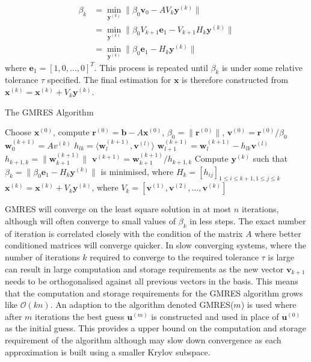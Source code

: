  \begin{equation*}
 \begin{aligned}
          \beta_k &= \min\limits_{\bm{y}^{(k)}} \lVert  \beta_0 \bm{v}_0 - AV_k\bm{y}^{(k)} \rVert \\
          &= \min\limits_{\bm{y}^{(k)}} \lVert \beta_0 V_{k+1} \bm{e}_1 - V_{k+1}H_k\bm{y}^{(k)} \rVert \\
          &= \min\limits_{\bm{y}^{(k)}} \lVert \beta_0 \bm{e}_1 - H_k\bm{y}^{(k)} \rVert
 \end{aligned}
 \end{equation*}
where $\bm{e}_1 = [1,0,\dots,0]^T$. This process is repeated until $\beta_k$ is under some relative tolerance $\tau$ specified. The final estimation for $\bm{x}$ is therefore constructed from $\bm{x}^{(k)} = \bm{x}^{(k)} + V_k\bm{y}^{(k)}$.
\begin{algorithm}
\caption{The GMRES Algorithm}\label{alg:GMRES}
\begin{algorithmic}[1]
\State Choose $\bm{x}^{(0)}$, compute $\bm{r}^{(0)}=\bm{b}-A\bm{x}^{(0)}$, $\beta_0 = \lVert \bm{r}^{(0)} \rVert$, $\bm{v}^{(0)} = \bm{r}^{(0)}/\beta_0$
\State $\bm{w}_0^{(k+1)} = Av^{(k)}$
\State $h_{lk}=\langle \bm{w}_l^{(k+1)}, \bm{v}^{(l)} \rangle$
\State $\bm{w}_{l+1}^{(k+1)} = \bm{w}_l^{(k+1)} - h_{lk}\bm{v}^{(l)}$
\EndFor
\State $h_{k+1,k}=\lVert \bm{w}_{k+1}^{(k+1)} \rVert$
\State $\bm{v}^{(k+1)} = \bm{w}_{k+1}^{(k+1)}/h_{k+1,k}$
\State Compute $\bm{y}^{(k)}$ such that $\beta_k = \lVert \beta_0 \bm{e}_1 - H_k  \bm{y}^{(k)} \rVert$ is minimised, where
\State $H_k = [h_{ij}]_{1 \leq i \leq k+1, 1 \leq j \leq k}$
\EndFor
\State $\bm{x}^{(k)} = \bm{x}^{(k)} + V_k\bm{y}^{(k)}$, where $V_k = [\bm{v}^{(1)},\bm{v}^{(2)},\dots,\bm{v}^{(k)}]$
\end{algorithmic}
\end{algorithm}

GMRES will converge on the least square solution in at most $n$ iterations, although will often converge to small values of $\beta_k$ in less steps. The exact number of iteration is correlated closely with the  condition of the matrix $A$ where better conditioned matrices will converge quicker. In slow converging systems, where the number of iterations $k$ required to converge to the required tolerance $\tau$ is large can result in large computation and storage requirements as the new vector $\bm{v}_{k+1}$ needs to be orthogonalised against all previous vectors in the basis. This means that the computation and storage requirements for the GMRES algorithm grows like $\mathcal{O}(kn)$. An adaption to the algorithm denoted GMRES($m$) is used where after $m$ iterations the best guess $\bm{u}^{(m)}$ is constructed and used in place of $\bm{u}^{(0)}$ as the initial guess. This provides a upper bound on the computation and storage requirement of the algorithm although may slow down convergence as each approximation is built using a smaller Krylov subspace.

